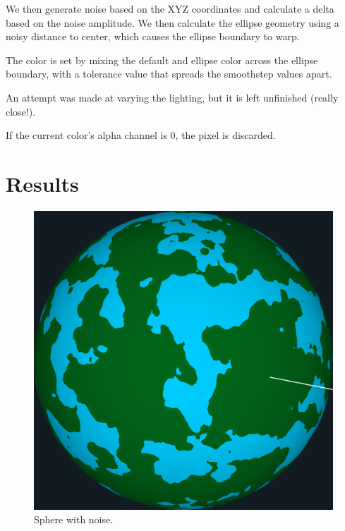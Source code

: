 \documentclass[12pt,letterpaper]{article}
\begin{document}
We then generate noise based on the XYZ coordinates and calculate a delta based
on the noise amplitude. We then calculate the ellipse geometry using a noisy
distance to center, which causes the ellipse boundary to warp.

The color is set by mixing the default and ellipse color across the ellipse
boundary, with a tolerance value that spreads the smoothstep values apart.

An attempt was made at varying the lighting, but it is left unfinished (really
close!).

If the current color's alpha channel is 0, the pixel is discarded.


\newpage
\section*{Results}

\begin{figure}[!h]
    \centering
    \includegraphics[width=1.0\textwidth]{img/sphere_noise.png}
    \caption{Sphere with noise.}
    \label{fig:spherenoise}
\end{figure}
\end{document}
